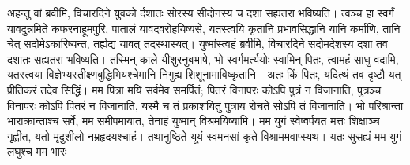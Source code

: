 \vakya अहन्तु वां ब्रवीमि, विचारदिने युवको र्दशातः सोरस्य सीदोनस्य च दशा सह्यतरा भविष्यति।
\vakya त्वञ्च हा स्वर्गं यावदुन्नमिते कफरनाहूमपुरि, पातालं यावदवरोहयिष्यसे, यतस्त्वयि कृतानि प्रभावसिद्धानि यानि कर्माणि, तानि चेत् सदोमेऽकारिष्यन्त, तर्ह्यद्य यावत् तदस्थास्यत्।
\vakya युष्मांस्त्वहं ब्रवीमि, विचारदिने सदोमदेशस्य दशा तव दशातः सह्यतरा भविष्यति।
\vakya तस्मिन् काले यीशुरनुबभाषे, भो स्वर्गमर्त्ययोः स्वामिन् पितः, त्वामहं साधु वदामि, यतस्त्वया विज्ञेभ्यस्तीक्ष्णबुद्धिभियश्चेमानि निगुह्य शिशूनामाविष्कृतानि।
\vakya अतः किं पितः, यदित्थं तव दृष्टौ यत् प्रीतिकरं तदेव सिद्धिं।
\vakya मम पित्रा मयि सर्वमेव समर्पितं; पितरं विनापरः कोऽपि पुत्रं न विजानाति, पुत्रञ्च विनापरः कोऽपि पितरं न विजानाति, यस्मै च तं प्रकाशयितुं पुत्राय रोचते सोऽपि तं विजानाति।
\vakya भो परिश्रान्ता भाराक्रान्ताश्च सर्वे, मम समीपमायात, तेनाहं युष्मान् विश्रमयिष्यामि।
\vakya मम युगं स्वेष्वर्पयत मत्तः शिक्षाञ्च गृह्णीत, यतो मृदुशीलो नम्रहृदयश्चाहं। तथानुष्ठिते यूयं स्वमनसां कृते विश्राममवाप्स्यथ।
\vakya यतः सुसह्यं मम युगं लघुश्च मम भारः\eoc